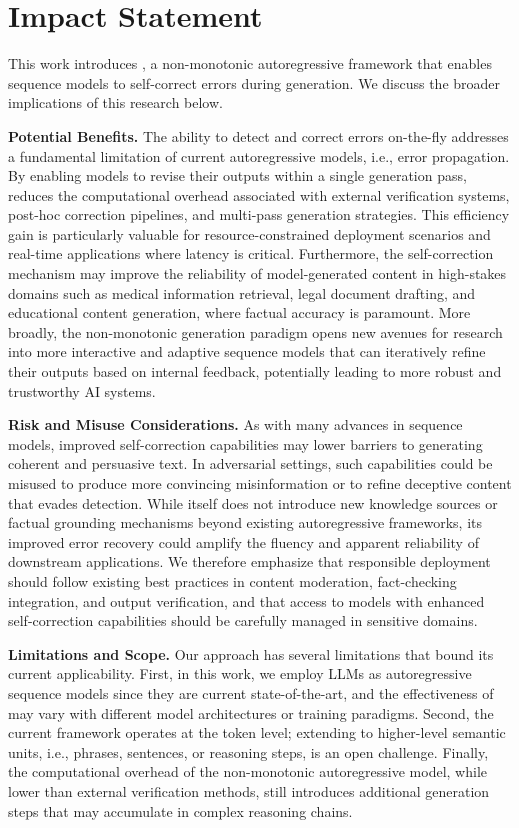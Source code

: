 \section*{Impact Statement}

This work introduces \modelname, a non-monotonic autoregressive framework that enables sequence models to self-correct errors during generation. We discuss the broader implications of this research below.

\textbf{Potential Benefits.}
The ability to detect and correct errors on-the-fly addresses a fundamental limitation of current autoregressive models, i.e., error propagation. 
By enabling models to revise their outputs within a single generation pass, \modelname reduces the computational overhead associated with external verification systems, post-hoc correction pipelines, and multi-pass generation strategies.
This efficiency gain is particularly valuable for resource-constrained deployment scenarios and real-time applications where latency is critical.
Furthermore, the self-correction mechanism may improve the reliability of model-generated content in high-stakes domains such as medical information retrieval, legal document drafting, and educational content generation, where factual accuracy is paramount.
More broadly, the non-monotonic generation paradigm opens new avenues for research into more interactive and adaptive sequence models that can iteratively refine their outputs based on internal feedback, potentially leading to more robust and trustworthy AI systems.

\textbf{Risk and Misuse Considerations.}
As with many advances in sequence models, improved self-correction capabilities may lower barriers to generating coherent and persuasive text.
In adversarial settings, such capabilities could be misused to produce more convincing misinformation or to refine deceptive content that evades detection.
While \modelname itself does not introduce new knowledge sources or factual grounding mechanisms beyond existing autoregressive frameworks, its improved error recovery could amplify the fluency and apparent reliability of downstream applications.
We therefore emphasize that responsible deployment should follow existing best practices in content moderation, fact-checking integration, and output verification, and that access to models with enhanced self-correction capabilities should be carefully managed in sensitive domains.

\textbf{Limitations and Scope.}
Our approach has several limitations that bound its current applicability.
First, in this work, we employ LLMs as autoregressive sequence models since they are current state-of-the-art, and the effectiveness of \modelname may vary with different model architectures or training paradigms.
Second, the current framework operates at the token level; extending to higher-level semantic units, i.e., phrases, sentences, or reasoning steps, is an open challenge.
Finally, the computational overhead of the non-monotonic autoregressive model, while lower than external verification methods, still introduces additional generation steps that may accumulate in complex reasoning chains.

